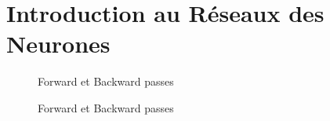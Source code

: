 \chapter{Introduction au Réseaux des Neurones}

\begin{figure}[h]
    \centering
	
    \caption{Forward et Backward passes}
    \label{fig:forward-backward-pass}
\end{figure}


\begin{figure}[h]
    \centering
	
    \caption{Forward et Backward passes}
    \label{fig:forward-backward-pass}
\end{figure}